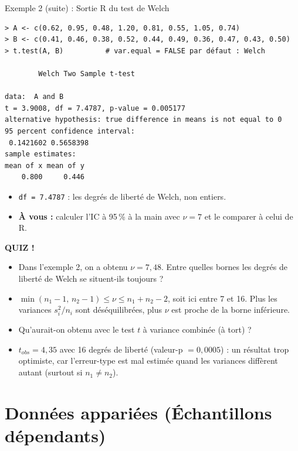 \documentclass{BeamerTemplate}
\begin{document}
\begin{frame}[fragile,t]{Exemple 2 (suite) : Sortie R du test de Welch}
\begin{Verbatim}[fontsize=\scriptsize]
> A <- c(0.62, 0.95, 0.48, 1.20, 0.81, 0.55, 1.05, 0.74)
> B <- c(0.41, 0.46, 0.38, 0.52, 0.44, 0.49, 0.36, 0.47, 0.43, 0.50)
> t.test(A, B)          # var.equal = FALSE par défaut : Welch

        Welch Two Sample t-test

data:  A and B
t = 3.9008, df = 7.4787, p-value = 0.005177
alternative hypothesis: true difference in means is not equal to 0
95 percent confidence interval:
 0.1421602 0.5658398
sample estimates:
mean of x mean of y
    0.800     0.446
\end{Verbatim}

  \small
  \begin{itemize}\itemsep 1mm
    \item \texttt{df = 7.4787} : les degrés de liberté de Welch, non entiers.
    \item \textbf{À vous :} calculer l'IC à 95\,\% à la main avec $\nu = 7$ et le comparer à celui de R.
  \end{itemize}
\end{frame}

\begin{frame}[plain,t]
  \centerline{\LARGE\bfseries\alert{QUIZ !}}

  \medskip
  \begin{itemize}\itemsep 0.8cm
    \item Dans l'exemple 2, on a obtenu $\nu = 7{,}48$. Entre quelles bornes les degrés de liberté de Welch se situent-ils toujours ?
    \item<2-> $\min(n_1 - 1,\, n_2 - 1) \le \nu \le n_1 + n_2 - 2$, soit ici entre 7 et 16. Plus les variances $s_i^2/n_i$ sont déséquilibrées, plus $\nu$ est proche de la borne inférieure.
    \item Qu'aurait-on obtenu avec le test $t$ à variance combinée (à tort) ?
    \item<2-> $t_{obs} = 4{,}35$ avec 16 degrés de liberté (valeur-p $= 0{,}0005$) : un résultat \alert{trop optimiste}, car l'erreur-type est mal estimée quand les variances diffèrent autant (surtout si $n_1 \neq n_2$).
  \end{itemize}
\end{frame}

\section{Données appariées (Échantillons dépendants)}
\end{document}
